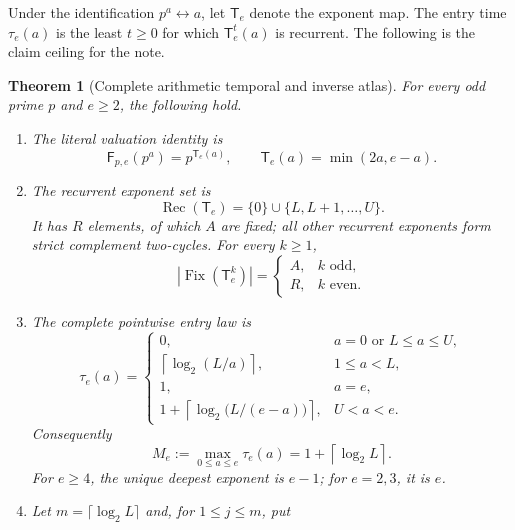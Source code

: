 \documentclass[10pt,a4paper]{amsart}
\newtheorem{theorem}{Theorem}[section]
\theoremstyle{definition}
\theoremstyle{remark}
\newcommand{\F}{\mathsf F}
\newcommand{\T}{\mathsf T}
\newcommand{\Rec}{\operatorname{Rec}}
\newcommand{\Fix}{\operatorname{Fix}}
\begin{document}
Under the identification $p^a\leftrightarrow a$, let $\T_e$ denote the
exponent map.  The entry time $\tau_e(a)$ is the least $t\geq0$ for which
$\T_e^t(a)$ is recurrent.  The following is the claim ceiling for the note.

\begin{theorem}[Complete arithmetic temporal and inverse atlas]\label{thm:main}
For every odd prime $p$ and $e\geq2$, the following hold.
\begin{enumerate}[label=\textup{(\roman*)}]
\item The literal valuation identity is
\begin{equation}\label{eq:conjugacy}
 \F_{p,e}(p^a)=p^{\T_e(a)},
 \qquad \T_e(a)=\min(2a,e-a).
\end{equation}
\item The recurrent exponent set is
\begin{equation}\label{eq:recurrent-set}
 \Rec(\T_e)=\{0\}\cup\{L,L+1,\ldots,U\}.
\end{equation}
It has $R$ elements, of which $A$ are fixed; all other recurrent exponents
form strict complement two-cycles.  For every $k\geq1$,
\begin{equation}\label{eq:fixed-iterates}
 |\Fix(\T_e^k)|=
 \begin{cases}
 A,&k\text{ odd},\\
 R,&k\text{ even}.
 \end{cases}
\end{equation}
\item The complete pointwise entry law is
\begin{equation}\label{eq:entry-law}
 \tau_e(a)=
 \begin{cases}
 0,&a=0\text{ or }L\leq a\leq U,\\
 \left\lceil\log_2(L/a)\right\rceil,&1\leq a<L,\\
 1,&a=e,\\
 1+\left\lceil\log_2\bigl(L/(e-a)\bigr)\right\rceil,
      &U<a<e.
 \end{cases}
\end{equation}
Consequently
\begin{equation}\label{eq:max-clock}
 M_e:=\max_{0\leq a\leq e}\tau_e(a)
 =1+\left\lceil\log_2L\right\rceil.
\end{equation}
For $e\geq4$, the unique deepest exponent is $e-1$; for $e=2,3$, it is $e$.
\item Let $m=\lceil\log_2L\rceil$ and, for $1\leq j\leq m$, put
\begin{equation}\label{eq:cj}

\end{equation}
\end{enumerate}
\end{theorem}
\end{document}
